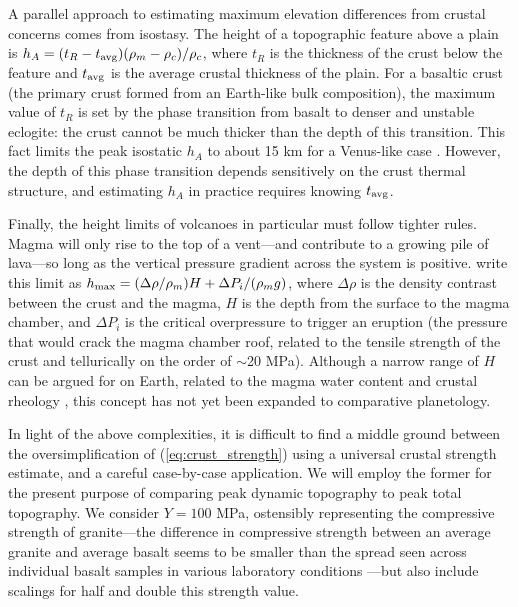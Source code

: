 A parallel approach to estimating maximum elevation differences from crustal concerns comes from isostasy. The height of a topographic feature above a plain is $h_A = (t_R - t_{\rm avg})(\rho_m - \rho_c)/\rho_c$, where $t_R$ is the thickness of the crust below the feature and $t_{\rm avg}$ is the average crustal thickness of the plain. For a basaltic crust (the primary crust formed from an Earth-like bulk composition), the maximum value of $t_R$ is set by the phase transition from basalt to denser and unstable eclogite: the crust cannot be much thicker than the depth of this transition. This fact limits the peak isostatic $h_A$ to about 15 km for a Venus-like case \citep{jull_implications_1995}. However, the depth of this phase transition depends sensitively on the crust thermal structure, and estimating $h_A$ in practice requires knowing $t_{\rm avg}$.

Finally, the height limits of volcanoes in particular must follow tighter rules. Magma will only rise to the top of a vent---and contribute to a growing pile of lava---so long as the vertical pressure gradient across the system is positive. \citet{castruccio_influence_2017} write this limit as $h_{\rm max} = (\Delta\rho/\rho_m) H + \Delta P_i/(\rho_m g)$, where $\Delta\rho$ is the density contrast between the crust and the magma, $H$ is the depth from the surface to the magma chamber, and $\Delta P_i$ is the critical overpressure to trigger an eruption (the pressure that would crack the magma chamber roof, related to the tensile strength of the crust and tellurically on the order of $\sim$20 MPa). Although a narrow range of $H$ can be argued for on Earth, related to the magma water content and crustal rheology \citep{huber_optimal_2019}, this concept has not yet been expanded to comparative planetology. 

In light of the above complexities, it is difficult to find a middle ground between the oversimplification of (\ref{eq:crust_strength}) using a universal crustal strength estimate, and a careful case-by-case application. %
We will employ the former for the present purpose of comparing peak dynamic topography to peak total topography. We consider $Y = 100$ MPa, ostensibly representing the compressive strength of granite---the difference in compressive strength between an average granite and average basalt seems to be smaller than the spread seen across individual basalt samples in various laboratory conditions \citep{heap_low_2017}---but also include scalings for half and double this strength value.



